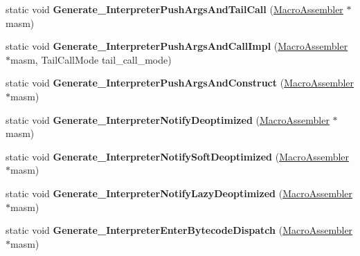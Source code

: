 \begin{DoxyCompactItemize}
\item 
static void {\bfseries Generate\+\_\+\+Interpreter\+Push\+Args\+And\+Tail\+Call} (\hyperlink{classv8_1_1internal_1_1_macro_assembler}{Macro\+Assembler} $\ast$masm)\hypertarget{classv8_1_1internal_1_1_builtins_acc7e54a8f0948428e1d5a636ff15383e}{}\label{classv8_1_1internal_1_1_builtins_acc7e54a8f0948428e1d5a636ff15383e}

\item 
static void {\bfseries Generate\+\_\+\+Interpreter\+Push\+Args\+And\+Call\+Impl} (\hyperlink{classv8_1_1internal_1_1_macro_assembler}{Macro\+Assembler} $\ast$masm, Tail\+Call\+Mode tail\+\_\+call\+\_\+mode)\hypertarget{classv8_1_1internal_1_1_builtins_a36fe9442084c69face2d6d4d38db93df}{}\label{classv8_1_1internal_1_1_builtins_a36fe9442084c69face2d6d4d38db93df}

\item 
static void {\bfseries Generate\+\_\+\+Interpreter\+Push\+Args\+And\+Construct} (\hyperlink{classv8_1_1internal_1_1_macro_assembler}{Macro\+Assembler} $\ast$masm)\hypertarget{classv8_1_1internal_1_1_builtins_a2fa092eeed4904f76aff1cc1cccfc238}{}\label{classv8_1_1internal_1_1_builtins_a2fa092eeed4904f76aff1cc1cccfc238}

\item 
static void {\bfseries Generate\+\_\+\+Interpreter\+Notify\+Deoptimized} (\hyperlink{classv8_1_1internal_1_1_macro_assembler}{Macro\+Assembler} $\ast$masm)\hypertarget{classv8_1_1internal_1_1_builtins_a41dbe37048fd65c4aac2e5a750260814}{}\label{classv8_1_1internal_1_1_builtins_a41dbe37048fd65c4aac2e5a750260814}

\item 
static void {\bfseries Generate\+\_\+\+Interpreter\+Notify\+Soft\+Deoptimized} (\hyperlink{classv8_1_1internal_1_1_macro_assembler}{Macro\+Assembler} $\ast$masm)\hypertarget{classv8_1_1internal_1_1_builtins_a35fa2e7b1d31f27de85a901eac44e138}{}\label{classv8_1_1internal_1_1_builtins_a35fa2e7b1d31f27de85a901eac44e138}

\item 
static void {\bfseries Generate\+\_\+\+Interpreter\+Notify\+Lazy\+Deoptimized} (\hyperlink{classv8_1_1internal_1_1_macro_assembler}{Macro\+Assembler} $\ast$masm)\hypertarget{classv8_1_1internal_1_1_builtins_af694c8dc0c2e67cd98e0d8fea792f172}{}\label{classv8_1_1internal_1_1_builtins_af694c8dc0c2e67cd98e0d8fea792f172}

\item 
static void {\bfseries Generate\+\_\+\+Interpreter\+Enter\+Bytecode\+Dispatch} (\hyperlink{classv8_1_1internal_1_1_macro_assembler}{Macro\+Assembler} $\ast$masm)\hypertarget{classv8_1_1internal_1_1_builtins_a10c33c8f0b3850afd184abba4a47dabb}{}\label{classv8_1_1internal_1_1_builtins_a10c33c8f0b3850afd184abba4a47dabb}


\end{DoxyCompactItemize}
